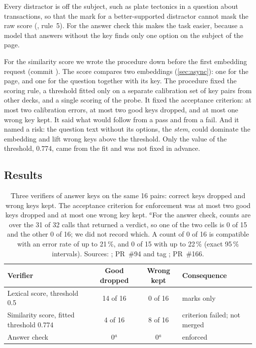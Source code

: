 Every distractor is off the subject, such as plate tectonics in a question
about transactions, so that the mark for a better-supported distractor cannot
mask the raw score (, rule~5). For the answer check
this makes the task easier, because a model that answers without the key
finds only one option on the subject of the page.

For the similarity score we wrote the procedure down before the first
embedding request (commit ). The score compares
two embeddings (\cref{sec:async}): one for the page, and one for the question
together with its key.
The procedure fixed the scoring rule, a threshold fitted only on a separate
calibration set of key pairs from other decks, and a single scoring of the
probe. It fixed the acceptance criterion: at most two calibration errors, at
most two good keys dropped, and at most one wrong key kept. It said what would
follow from a pass and from a fail. And it named a risk: the question text
without its options, the \emph{stem}, could dominate the embedding and lift
wrong keys above the threshold. Only the value of the threshold, 0.774, came
from the fit and was not fixed in advance.

\subsection{Results}
\label{sec:c6-results}

\begin{table}[htbp]
  \centering
  \small
  \caption{Three verifiers of answer keys on the same 16 pairs: correct keys
    dropped and wrong keys kept. The acceptance criterion for enforcement was
    at most two good keys dropped and at most one wrong key kept. $^{a}$For
    the answer check, counts are over the 31 of 32 calls that returned a
    verdict, so one of the two cells is 0 of 15 and the other 0 of 16; we did
    not record which. A count of 0 of 16 is compatible with an error rate of up
    to 21\,\%, and 0 of 15 with up to 22\,\% (exact 95\,\% intervals).
    Sources: ; PR~\#94 and
    tag ; PR~\#166.}
  \label{tab:verifiers}
  \begin{tabular}{@{}p{}ccp{}@{}}
    \toprule
    Verifier & Good dropped & Wrong kept & Consequence \\
    \midrule
    Lexical score, threshold 0.5 & 14 of 16 & 0 of 16 & marks only \\
    Similarity score, fitted threshold 0.774 & 4 of 16 & 8 of 16 &
      criterion failed; not merged \\
    Answer check & 0$^{a}$ & 0$^{a}$ & enforced \\
    \bottomrule
  \end{tabular}
\end{table}

